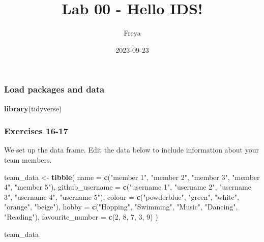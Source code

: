 \documentclass[
]{article}
\title{Lab 00 - Hello IDS!}
\author{Freya}
\date{2023-09-23}
\newenvironment{Shaded}{\begin{snugshade}}{\end{snugshade}}
\newcommand{\AttributeTok}[1]{\textcolor[rgb]{0.13,0.29,0.53}{#1}}
\newcommand{\DecValTok}[1]{\textcolor[rgb]{0.00,0.00,0.81}{#1}}
\newcommand{\FunctionTok}[1]{\textcolor[rgb]{0.13,0.29,0.53}{\textbf{#1}}}
\newcommand{\NormalTok}[1]{#1}
\newcommand{\OtherTok}[1]{\textcolor[rgb]{0.56,0.35,0.01}{#1}}
\newcommand{\StringTok}[1]{\textcolor[rgb]{0.31,0.60,0.02}{#1}}
\begin{document}
\maketitle

\hypertarget{load-packages-and-data}{%
\subsubsection{Load packages and data}\label{load-packages-and-data}}

\begin{Shaded}
\begin{Highlighting}[]
\FunctionTok{library}\NormalTok{(tidyverse) }
\end{Highlighting}
\end{Shaded}

\hypertarget{exercises-16-17}{%
\subsubsection{Exercises 16-17}\label{exercises-16-17}}

We set up the data frame. Edit the data below to include information
about your team members.

\begin{Shaded}
\begin{Highlighting}[]
\NormalTok{team\_data }\OtherTok{\textless{}{-}} \FunctionTok{tibble}\NormalTok{(}
  \AttributeTok{name =} \FunctionTok{c}\NormalTok{(}\StringTok{"member 1"}\NormalTok{, }\StringTok{"member 2"}\NormalTok{, }
           \StringTok{"member 3"}\NormalTok{, }\StringTok{"member 4"}\NormalTok{, }\StringTok{"member 5"}\NormalTok{),}
  \AttributeTok{github\_username =} \FunctionTok{c}\NormalTok{(}\StringTok{"username 1"}\NormalTok{, }\StringTok{"username 2"}\NormalTok{, }
                      \StringTok{"username 3"}\NormalTok{, }\StringTok{"username 4"}\NormalTok{, }\StringTok{"username 5"}\NormalTok{), }
  \AttributeTok{colour =} \FunctionTok{c}\NormalTok{(}\StringTok{"powderblue"}\NormalTok{, }\StringTok{"green"}\NormalTok{, }\StringTok{"white"}\NormalTok{, }
             \StringTok{"orange"}\NormalTok{, }\StringTok{"beige"}\NormalTok{),}
  \AttributeTok{hobby =} \FunctionTok{c}\NormalTok{(}\StringTok{"Hopping"}\NormalTok{, }\StringTok{"Swimming"}\NormalTok{, }\StringTok{"Music"}\NormalTok{, }
            \StringTok{"Dancing"}\NormalTok{, }\StringTok{"Reading"}\NormalTok{),}
  \AttributeTok{favourite\_number =} \FunctionTok{c}\NormalTok{(}\DecValTok{2}\NormalTok{, }\DecValTok{8}\NormalTok{, }\DecValTok{7}\NormalTok{, }\DecValTok{3}\NormalTok{, }\DecValTok{9}\NormalTok{)}
\NormalTok{  )}

\NormalTok{team\_data}
\end{Highlighting}
\end{Shaded}
\end{document}
